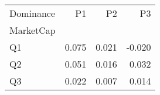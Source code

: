 \begin{tabular}{lrrr}
\toprule
Dominance & P1 & P2 & P3 \\
MarketCap &  &  &  \\
\midrule
Q1 & 0.075 & 0.021 & -0.020 \\
Q2 & 0.051 & 0.016 & 0.032 \\
Q3 & 0.022 & 0.007 & 0.014 \\
\bottomrule
\end{tabular}
